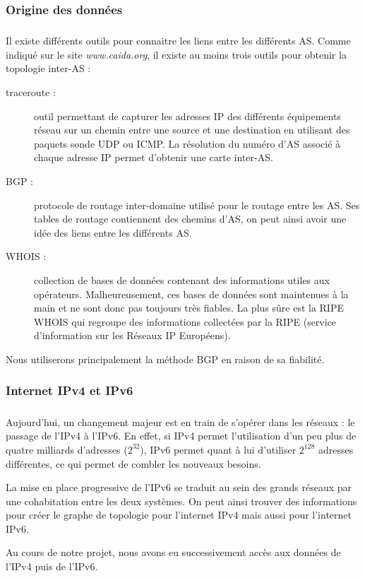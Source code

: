 \subsubsection{Origine des donn\'ees}
\subparagraph{}
Il existe diff\'erents outils pour connaitre les liens entre les diff\'erents AS. Comme indiqu\'e sur le site \textit{www.caida.org}, il existe au moins trois outils pour obtenir la topologie inter-AS :
\begin{description}
 \item[traceroute : ] outil permettant de capturer les adresses IP des diff\'erents \'equipements r\'eseau sur un chemin entre une source et une destination en utilisant des paquets sonde UDP ou ICMP. La r\'esolution du num\'ero d'AS associ\'e \`a chaque adresse IP permet d'obtenir une carte inter-AS.
 \item[BGP : ] protocole de routage inter-domaine utilis\'e pour le routage entre les AS. Ses tables de routage contiennent des chemins d'AS, on peut ainsi avoir une idée des liens entre les diff\'erents AS.
 \item[WHOIS : ] collection de bases de donn\'ees contenant des informations utiles aux op\'erateurs. Malheureusement, ces bases de donn\'ees sont maintenues \`a la main et ne  sont donc pas toujours tr\`es fiables. La plus sûre est la RIPE WHOIS qui regroupe des informations collect\'ees par la RIPE (service d'information sur les R\'eseaux IP Europ\'eens).
\end{description}
\par
Nous utiliserons principalement la m\'ethode BGP en raison de sa fiabilit\'e.

\subsubsection{Internet IPv4 et IPv6}
\subparagraph{}
Aujourd'hui, un changement majeur est en train de s'op\'erer dans les r\'eseaux : le passage de l'IPv4 \`a l'IPv6. En effet, si IPv4 permet l'utilisation d'un peu plus de quatre milliards d'adresses ($2^{32}$), IPv6 permet quant \`a lui d'utiliser $2^{128}$ adresses diff\'erentes, ce qui permet de combler les nouveaux besoins.
\par
La mise en place progressive de l'IPv6 se traduit au sein des grands r\'eseaux par une cohabitation entre les deux syst\`emes. On peut ainsi trouver des informations pour cr\'eer le graphe de topologie pour l'internet IPv4 mais aussi pour l'internet IPv6.
\par
Au cours de notre projet, nous avons eu successivement acc\`es aux donn\'ees de l'IPv4 puis de l'IPv6.
% 
